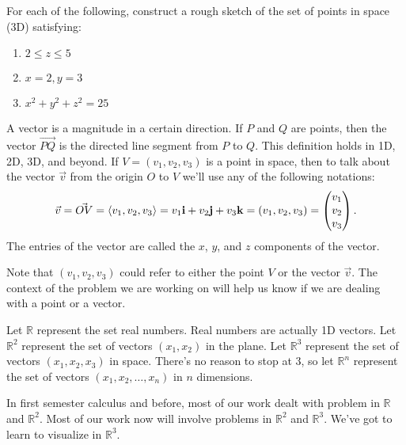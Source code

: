 \begin{problem}
For each of the following, construct a rough sketch of the set of points in space (3D) satisfying:
\begin{enumerate}
\item $2\leq z\leq 5$
\item $x=2,y=3$
\item $x^2+y^2+z^2=25$
\end{enumerate}
\end{problem}

\begin{definition}
A vector is a magnitude in a certain direction.  
If $P$ and $Q$ are points, then the vector $\vec{PQ}$ is the directed line segment from $P$ to $Q$. This definition holds in 1D, 2D, 3D, and beyond.  
If $V=(v_1,v_2,v_3)$ is a point in space, then to talk about the vector $\vec v$ from the origin $O$ to $V$ we'll use any of the following notations:
$$\vec v = \vec{OV}=\left<v_1,v_2,v_3\right> 
= v_1{\bf i}+v_2{\bf j}+v_3{\bf k} 
= (v_1,v_2,v_3) 
= \begin{pmatrix}v_1\\ v_2\\ v_3\end{pmatrix}
.$$
The entries of the vector are called the $x$, $y$, and $z$ components of the vector. 
\end{definition}
Note that $(v_1,v_2,v_3)$ could refer to either the point $V$ or the vector $\vec v$. The context of the problem we are working on will help us know if we are dealing with a point or a vector.

\begin{definition}
Let $\mathbb{R}$ represent the set real numbers. Real numbers are actually 1D vectors.  
Let $\mathbb{R}^2$ represent the set of vectors $(x_1,x_2)$ in the plane.
Let $\mathbb{R}^3$ represent the set of vectors $(x_1,x_2,x_3)$ in space. There's no reason to stop at 3, so let $\mathbb{R}^n$ represent the set of vectors $(x_1,x_2,\ldots,x_n)$ in $n$ dimensions.
\end{definition}
In first semester calculus and before, most of our work dealt with problem in $\mathbb{R}$ and $\mathbb{R}^2$. Most of our work now will involve problems in $\mathbb{R}^2$ and $\mathbb{R}^3$. We've got to learn to visualize in $\mathbb{R}^3$.

